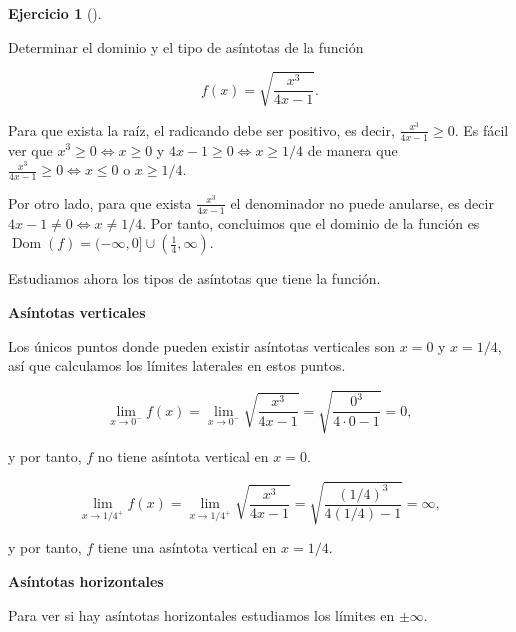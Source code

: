 \documentclass[
  a4paper,
]{scrreport}
\theoremstyle{definition}
\newtheorem{exercise}{Ejercicio}[chapter]
\theoremstyle{remark}
\begin{document}
\leavevmode{}%
\begin{exercise}[]\label{exr-4}

Determinar el dominio y el tipo de asíntotas de la función

\[f(x)=\sqrt{\frac{x^3}{4x-1}}.\]

\end{exercise}

\begin{tcolorbox}[enhanced jigsaw, colframe=quarto-callout-tip-color-frame, opacitybacktitle=0.6, colbacktitle=quarto-callout-tip-color!10!white, rightrule=.15mm, toptitle=1mm, opacityback=0, title=\textcolor{quarto-callout-tip-color}{\faLightbulb}\hspace{0.5em}{Solución}, arc=.35mm, toprule=.15mm, breakable, bottomtitle=1mm, titlerule=0mm, bottomrule=.15mm, leftrule=.75mm, coltitle=black, left=2mm, colback=white]

Para que exista la raíz, el radicando debe ser positivo, es decir,
\(\frac{x^3}{4x-1}\geq 0\). Es fácil ver que
\(x^3\geq 0\Leftrightarrow x\geq 0\) y
\(4x-1\geq 0\Leftrightarrow x\geq 1/4\) de manera que
\(\frac{x^3}{4x-1}\geq 0\Leftrightarrow x\leq 0 \mbox{ o } x\geq 1/4\).

Por otro lado, para que exista \(\frac{x^3}{4x-1}\) el denominador no
puede anularse, es decir \(4x-1\neq 0 \Leftrightarrow x\neq 1/4\). Por
tanto, concluimos que el dominio de la función es
\(\operatorname{Dom}(f)=(-\infty, 0]\cup (\frac{1}{4},\infty)\).

Estudiamos ahora los tipos de asíntotas que tiene la función.

\textbf{Asíntotas verticales}

Los únicos puntos donde pueden existir asíntotas verticales son \(x=0\)
y \(x=1/4\), así que calculamos los límites laterales en estos puntos.

\[
\lim_{x\to 0^-}f(x) = \lim_{x\to 0^-} \sqrt{\frac{x^3}{4x-1}} = \sqrt{\frac{0^3}{4\cdot 0-1}} = 0,
\]

y por tanto, \(f\) no tiene asíntota vertical en \(x=0\).

\[
\lim_{x\to 1/4^+}f(x) = \lim_{x\to 1/4^+} \sqrt{\frac{x^3}{4x-1}} = \sqrt{\frac{(1/4)^3}{4(1/4)-1}} = \infty,
\]

y por tanto, \(f\) tiene una asíntota vertical en \(x=1/4\).

\textbf{Asíntotas horizontales}

Para ver si hay asíntotas horizontales estudiamos los límites en
\(\pm \infty\).


\end{tcolorbox}
\end{document}
